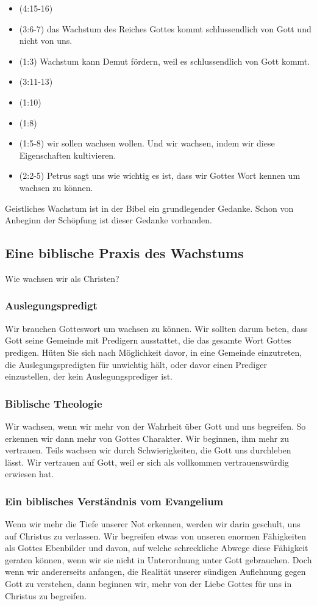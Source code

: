 \documentclass{../../inc/mybib}
\begin{document}
\begin{itemize}
    \item {}(4:15-16)
    \item {}(3:6-7) das Wachstum des Reiches Gottes kommt schlussendlich von Gott und nicht von uns.
    \item {}(1:3) Wachstum kann Demut fördern, weil es schlussendlich von Gott kommt.
    \item {}(3:11-13)
    \item {}(1:10)
    \item {}(1:8)
    \item {}(1:5-8) wir sollen wachsen wollen. Und wir wachsen, indem wir diese Eigenschaften kultivieren.
    \item {}(2:2-5) Petrus sagt uns wie wichtig es ist, dass wir Gottes Wort kennen um wachsen zu können.
\end{itemize}
Geistliches Wachstum ist in der Bibel ein grundlegender Gedanke. Schon von Anbeginn der Schöpfung ist dieser Gedanke vorhanden.
\subsection{Eine biblische Praxis des Wachstums}
Wie wachsen wir als Christen?
\subsubsection{Auslegungspredigt}
Wir brauchen Gotteswort um wachsen zu können. Wir sollten darum beten, dass Gott seine Gemeinde mit Predigern ausstattet, die das gesamte Wort Gottes predigen. Hüten Sie sich nach Möglichkeit davor, in eine Gemeinde einzutreten, die Auslegungspredigten für unwichtig hält, oder davor einen Prediger einzustellen, der kein Auslegungsprediger ist.
\subsubsection{Biblische Theologie}
Wir wachsen, wenn wir mehr von der Wahrheit über Gott und uns begreifen. So erkennen wir dann mehr von Gottes Charakter. Wir beginnen, ihm mehr zu vertrauen. Teils wachsen wir durch Schwierigkeiten, die Gott uns durchleben lässt. Wir vertrauen auf Gott, weil er sich als vollkommen vertrauenswürdig erwiesen hat.
\subsubsection{Ein biblisches Verständnis vom Evangelium}
Wenn wir mehr die Tiefe unserer Not erkennen, werden wir darin geschult, uns auf Christus zu verlassen. Wir begreifen etwas von unseren enormen Fähigkeiten als Gottes Ebenbilder und davon, auf welche schreckliche Abwege diese Fähigkeit geraten können, wenn wir sie nicht in Unterordnung unter Gott gebrauchen. Doch wenn wir andererseits anfangen, die Realität unserer sündigen Auflehnung gegen Gott zu verstehen, dann beginnen wir, mehr von der Liebe Gottes für uns in Christus zu begreifen.
\end{document}
